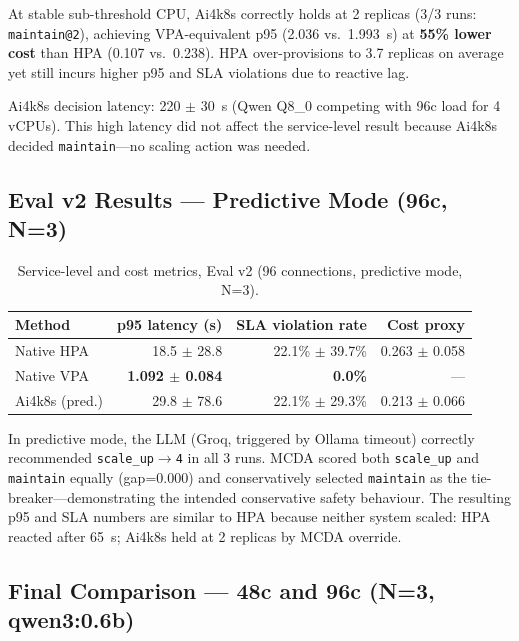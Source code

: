 At stable sub-threshold CPU, Ai4k8s correctly holds at 2 replicas (3/3 runs:
\texttt{maintain@2}), achieving VPA-equivalent p95 (2.036 vs.\ 1.993~s) at
\textbf{55\% lower cost} than HPA (0.107 vs.\ 0.238). HPA over-provisions to
3.7 replicas on average yet still incurs higher p95 and SLA violations due to
reactive lag.

Ai4k8s decision latency: 220 $\pm$ 30~s (Qwen Q8\_0 competing with 96c load
for 4 vCPUs). This high latency did not affect the service-level result because
Ai4k8s decided \texttt{maintain}—no scaling action was needed.

\subsection{Eval v2 Results — Predictive Mode (96c, N=3)}
\label{sec:eval-v2}

\begin{table}[h]
  \centering
  \caption{Service-level and cost metrics, Eval v2 (96 connections, predictive mode, N=3).}
  \label{tab:eval-v2}
  \begin{tabular}{lrrr}
    \toprule
    Method & p95 latency (s) & SLA violation rate & Cost proxy \\
    \midrule
    Native HPA    & 18.5 $\pm$ 28.8 & 22.1\% $\pm$ 39.7\% & 0.263 $\pm$ 0.058 \\
    Native VPA    & \textbf{1.092 $\pm$ 0.084}  & \textbf{0.0\%}     & --- \\
    Ai4k8s (pred.) & 29.8 $\pm$ 78.6 & 22.1\% $\pm$ 29.3\% & 0.213 $\pm$ 0.066 \\
    \bottomrule
  \end{tabular}
\end{table}

In predictive mode, the LLM (Groq, triggered by Ollama timeout) correctly
recommended \texttt{scale\_up$\to$4} in all 3 runs. MCDA scored both
\texttt{scale\_up} and \texttt{maintain} equally (gap=0.000) and conservatively
selected \texttt{maintain} as the tie-breaker—demonstrating the intended
conservative safety behaviour. The resulting p95 and SLA numbers are similar to
HPA because neither system scaled: HPA reacted after 65~s; Ai4k8s held at
2 replicas by MCDA override.

\subsection{Final Comparison — 48c and 96c (N=3, qwen3:0.6b)}
\label{sec:final-comparison}

